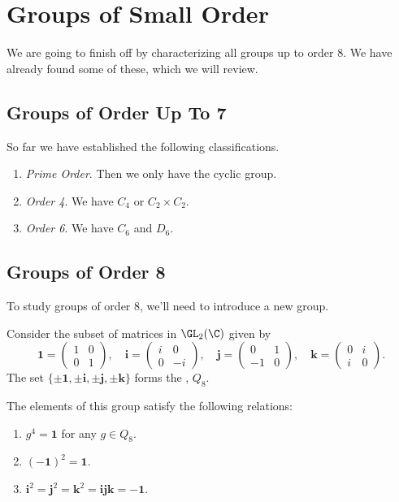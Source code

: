 \documentclass[a4paper]{scrartcl}
\newcommand{\newchapter}{\section}
\newcommand{\newsection}{\subsection}
\begin{document}
\newchapter{Groups of Small Order}

We are going to finish off by characterizing all groups up to order 8. We have already found some of these, which we will review.

\newsection{Groups of Order Up To 7}

So far we have established the following classifications.

\begin{enumerate}
	\item \emph{Prime Order}. Then we only have the cyclic group.
	\item \emph{Order 4}. We have $C_4$ or $C_2 \times C_2$.
	\item \emph{Order 6}. We have $C_6$ and $D_6$.
\end{enumerate}

\newsection{Groups of Order 8}

To study groups of order 8, we'll need to introduce a new group.

\begin{definition}[Quaternions]
	Consider the subset of matrices in $\GL_2(\C)$ given by
	$$
	\mathbf{1} = \begin{pmatrix}
		1 & 0 \\ 0 & 1
	\end{pmatrix}, \quad  \mathbf{i} = \begin{pmatrix}
		i & 0 \\ 0 & -i
	\end{pmatrix}, \quad \mathbf{j} = \begin{pmatrix}
		0 & 1 \\ -1 & 0
	\end{pmatrix}, \quad \mathbf{k} = \begin{pmatrix}
		0 & i \\ i & 0
	\end{pmatrix}.
	$$
	The set $\{\pm\mathbf{1}, \pm\mathbf{i}, \pm\mathbf{j}, \pm\mathbf{k}\}$ forms the , $Q_8$.
\end{definition}

The elements of this group satisfy the following relations:
\begin{enumerate}[label=(\roman*)]
	\item $g^4= \mathbf{1}$ for any $g \in Q_8$.
	\item $(-\mathbf{1})^2 = \mathbf{1}$.
	\item $\mathbf{i}^2 = \mathbf{j}^2 = \mathbf{k}^2 = \mathbf{ijk} = -\mathbf{1}$.
\end{enumerate}
\end{document}

